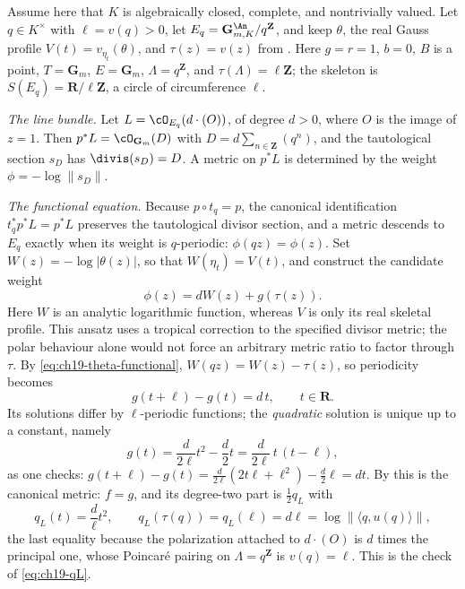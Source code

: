 \begin{example}
\label{ex:ch19-tate-canonical}
Assume here that $K$ is algebraically closed, complete, and nontrivially
valued.  Let $q\in K^\times$ with $\ell=v(q)>0$, let
$E_q=\mathbf G_{m,K}^{\An}/q^{\mathbf Z}$, and keep $\theta$,
the real Gauss profile $V(t)=v_{\eta_t}(\theta)$, and $\tau(z)=v(z)$ from
.  Here $g=r=1$, $b=0$, $B$ is a point,
$T=\mathbf G_m$, $E=\mathbf G_m$, $\Lambda=q^{\mathbf Z}$, and
$\tau(\Lambda)=\ell\mathbf Z$; the skeleton is
$S(E_q)=\mathbf R/\ell\mathbf Z$, a circle of circumference $\ell$.

\emph{The line bundle.}  Let $L=\cO_{E_q}(d\cdot(O))$, of degree $d>0$,
where $O$ is the image of $z=1$.  Then
$p^*L=\cO_{\mathbf G_m}(D)$ with $D=d\sum_{n\in\mathbf Z}(q^n)$, and the
tautological section $s_D$ has $\divis(s_D)=D$.  A metric on
$p^*L$ is determined by the weight $\phi=-\log\|s_D\|$.

\emph{The functional equation.}  Because $p\circ t_q=p$, the canonical
identification $t_q^*p^*L=p^*L$ preserves the tautological divisor section,
and a metric descends to $E_q$ exactly when its weight is $q$-periodic:
$\phi(qz)=\phi(z)$.  Set $W(z)=-\log|\theta(z)|$, so that
$W(\eta_t)=V(t)$, and construct the candidate weight
\[
 \phi(z)=dW(z)+g(\tau(z)).
\]
Here $W$ is an analytic logarithmic function, whereas $V$ is only its
real skeletal profile.  This ansatz uses a tropical correction to the
specified divisor metric; the polar behaviour alone would not force an
arbitrary metric ratio to factor through $\tau$.
By \eqref{eq:ch19-theta-functional},
$W(qz)=W(z)-\tau(z)$, so periodicity becomes
\begin{equation}
\label{eq:ch19-tate-cocycle}
 g(t+\ell)-g(t)=d\,t,\qquad t\in\mathbf R .
\end{equation}
Its solutions differ by $\ell$-periodic functions; the \emph{quadratic}
solution is unique up to a constant, namely
\begin{equation}
\label{eq:ch19-tate-g}
 g(t)=\frac{d}{2\ell}t^2-\frac{d}{2}t
     =\frac{d}{2\ell}\,t\,(t-\ell),
\end{equation}
as one checks:
$g(t+\ell)-g(t)=\frac{d}{2\ell}(2t\ell+\ell^2)-\frac d2\ell=dt$.
By  this is the canonical metric:
$f=g$, and its degree-two part is $\tfrac12q_L$ with
\begin{equation}
\label{eq:ch19-tate-qL}
 q_L(t)=\frac d\ell t^2,
 \qquad
 q_L(\tau(q))=q_L(\ell)=d\ell=\log\bigl\|\langle q,u(q)\rangle\bigr\| ,
\end{equation}
the last equality because the polarization attached to $d\cdot(O)$ is
$d$ times the principal one, whose Poincar\'e pairing on
$\Lambda=q^{\mathbf Z}$ is $v(q)=\ell$.  This is the check of
\eqref{eq:ch19-qL}.


\end{example}

